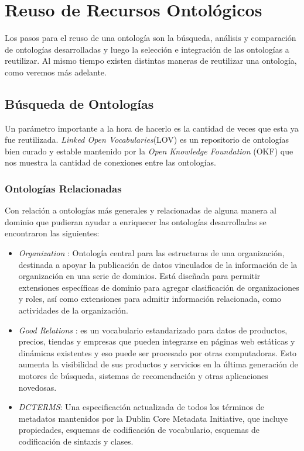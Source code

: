 
\section{Reuso de Recursos Ontológicos}
Los pasos para el reuso de una ontología son la búsqueda, análisis y comparación de ontologías desarrolladas y luego la selección e integración de las ontologías a reutilizar. Al mismo tiempo existen distintas maneras de reutilizar una ontología, como veremos más adelante. 

\subsection{Búsqueda de Ontologías}
\label{section:busqueda de ontologias}

Un parámetro importante a la hora de hacerlo es la cantidad de veces que esta ya fue reutilizada. \textit{Linked Open Vocabularies}(LOV) es un repositorio de ontologías bien curado y estable mantenido por la \textit{Open Knowledge Foundation}  (OKF) que nos muestra la cantidad de conexiones entre las ontologías.

\subsubsection{Ontologías Relacionadas}

Con relación a ontologías más generales y relacionadas de alguna manera al dominio que pudieran ayudar a enriquecer las ontologías desarrolladas se encontraron las siguientes:
\begin{itemize}
    \item \textit{Organization}\cite{TheOrgan48:online} : Ontología central para las estructuras de una organización, destinada a apoyar la publicación de datos vinculados de la información de la organización en una serie de dominios. Está diseñada para permitir extensiones específicas de dominio para agregar clasificación de organizaciones y roles, así como extensiones para admitir información relacionada, como actividades de la organización.
    \item \textit{Good Relations}\cite{hepp2008goodrelations} : es un vocabulario estandarizado para datos de productos, precios, tiendas y empresas que pueden integrarse en páginas web estáticas y dinámicas existentes y eso puede ser procesado por otras computadoras. Esto aumenta la visibilidad de sus productos y servicios en la última generación de motores de búsqueda, sistemas de recomendación y otras aplicaciones novedosas.
    \item \textit{DCTERMS}\cite{DCMIDCMI37:online}: Una especificación actualizada de todos los términos de metadatos mantenidos por la Dublin Core Metadata Initiative, que incluye propiedades, esquemas de codificación de vocabulario, esquemas de codificación de sintaxis y clases. 
\end{itemize}

